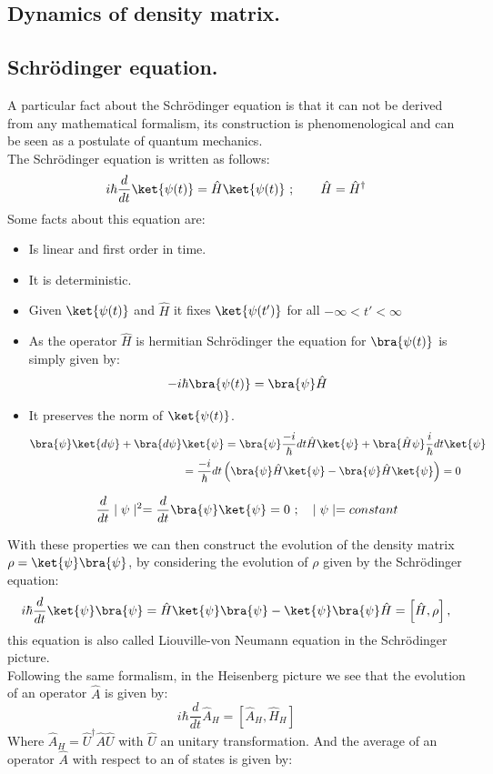 \begin{appendix}
\chapter{Dynamics of density matrix.}\label{AppendixA}
\section{Schr{\"o}dinger equation.}
A particular fact about the Schr{\"o}dinger equation is that it can not be derived from any mathematical formalism, its construction is phenomenological and can be seen as a postulate of quantum mechanics.\\
The Schr{\"o}dinger equation is written as follows:
\begin{equation}
i\hbar\frac{d}{dt}\ket{\psi(t)}=\hat{H}\ket{\psi(t)} \ ;\qquad \hat{H}=\hat{H}^{\dagger}
\label{scrodingereq}
\end{equation}
Some facts about this equation are:
\begin{itemize}
\item Is linear and first order in time.
\item It is deterministic.
\item Given $\ket{\psi(t)}$ and $\hat{H}$ it fixes $\ket{\psi(t')}$ for all $-\infty <t'<\infty$
\item As the operator $\hat{H}$ is hermitian Schr{\"o}dinger the equation for $\bra{\psi(t)}$ is simply given by:
\[-i\hbar\bra{\psi(t)}=\bra{\psi}\hat{H}\]

\item It preserves the norm of $\ket{\psi(t)}$.
\vspace{.5mm}
\begin{align*}
\bra{\psi}\ket {d\psi}+\bra{ d\psi}&\ket{ \psi}=\bra{\psi}\frac{-i}{\hbar}dt \hat{H}\ket{\psi}+\bra{\hat{H}\psi}\frac{i}{\hbar}dt\ket{\psi}\\
&=\frac{-i}{\hbar}dt\left(\bra{\psi}\hat{H}\ket{\psi}-\bra{\psi}\hat{H}\ket{\psi}\right)=0
\end{align*}

\[\frac{d}{dt}\mid\psi\mid^2=\frac{d}{dt}\bra{\psi}\ket{\psi}=0 \ ; \quad\mid\psi\mid=constant\]

\end{itemize}
With these properties we can then construct the evolution of the density matrix $\rho=\ket{\psi}\bra{\psi}$, by considering the evolution of $\rho$ given by the Schr{\"o}dinger equation:
\begin{equation}
i\hbar\frac{d}{dt}\ket{\psi}\bra{\psi}=\hat{H}\ket{\psi}\bra{\psi}-\ket{\psi}\bra{\psi}\hat{H}=\left[\hat{H},\rho\right],
\label{liouville-vonnuemann}
\end{equation}
this equation is also called Liouville-von Neumann equation in the Schr{\"o}dinger picture.\\
Following the same formalism, in the Heisenberg picture we see that the evolution of an operator $\hat{A}$ is given by:
\[i\hbar\frac{d}{dt}\hat{A}_H=\left[\hat{A}_H,\hat{H}_H\right]\]
Where $\hat{A}_H=\hat{U}^{\dagger}\hat{A}\hat{U}$ with $\hat{U}$ an unitary transformation. And the average of an operator $\hat{A}$ with respect to an  of states is given by:


\end{appendix}
